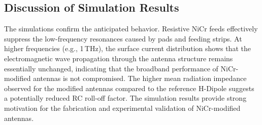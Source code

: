 \subsection{Discussion of Simulation Results}

The simulations confirm the anticipated behavior.  Resistive NiCr feeds effectively suppress the low-frequency resonances caused by pads and feeding strips. At higher frequencies (e.g., \num{1}\,\si{\tera\hertz}), the surface current distribution shows that the electromagnetic wave propagation through the antenna structure remains essentially unchanged, indicating that the broadband performance of NiCr-modified antennas is not compromised. The higher mean radiation impedance observed for the modified antennas compared to the reference H-Dipole suggests a potentially reduced RC roll-off factor. The simulation results provide strong motivation for the fabrication and experimental validation of NiCr-modified antennas.
